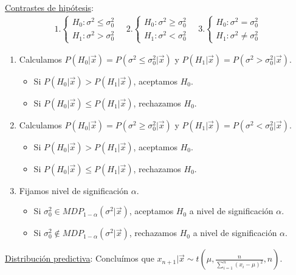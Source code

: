 \underline{Contrastes de hipótesis}:
\begin{align*}
    1. \begin{cases}
           H_0 : \sigma^2 \leq \sigma^2_0 \\
           H_1 : \sigma^2 > \sigma^2_0
       \end{cases} \quad     2.\begin{cases}
                                   H_0 : \sigma^2 \ge \sigma^2_0 \\
                                   H_1 : \sigma^2< \sigma^2_0
                               \end{cases} \quad     3.\begin{cases}
                                                           H_0 : \sigma^2 = \sigma^2_0 \\
                                                           H_1 : \sigma^2\not = \sigma^2_0
                                                       \end{cases}
\end{align*}

\begin{enumerate}
    \item Calculamos $P(H_0 | \vec{x}) = P(\sigma^2\leq \sigma^2_0 |\vec{x})$ y $P(H_1 | \vec{x}) = P(\sigma^2 > \sigma^2_0 | \vec{x})$.
          \begin{itemize}
              \item Si $P(H_0 | \vec{x}) > P(H_1 | \vec{x})$, aceptamos $H_0$.
              \item Si $P(H_0 | \vec{x}) \leq P(H_1 | \vec{x})$, rechazamos $H_0$.
          \end{itemize}
    \item Calculamos $P(H_0 | \vec{x}) = P(\sigma^2 \ge \sigma^2_0 |\vec{x})$ y $P(H_1 | \vec{x}) = P(\sigma^2< \sigma^2_0 | \vec{x})$.
          \begin{itemize}
              \item Si $P(H_0 | \vec{x}) > P(H_1 | \vec{x})$, aceptamos $H_0$.
              \item Si $P(H_0 | \vec{x}) \leq P(H_1 | \vec{x})$, rechazamos $H_0$.
          \end{itemize}
    \item Fijamos nivel de significación $\alpha$.
          \begin{itemize}
              \item Si $\sigma^2_0 \in MDP_{1 - \alpha}(\sigma^2 | \vec{x})$, aceptamos $H_0$ a nivel de significación $\alpha$.
              \item Si $\sigma^2_0 \not\in MDP_{1 - \alpha}(\sigma^2| \vec{x})$, rechazamos $H_0$ a nivel de significación $\alpha$.
          \end{itemize}
\end{enumerate}
\underline{Distribución predictiva}: Concluímos que $x_{n+1} | \vec{x} \sim t\left(\mu, \frac{n}{\sum_{i=1}^{n} (x_i - \mu)^2}, n \right)$.

